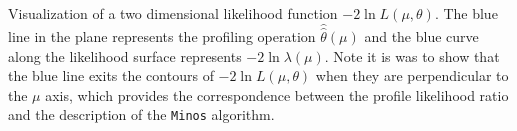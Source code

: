 Visualization of a two dimensional likelihood function $-2\ln L(\mu,\theta)$.  The blue line in the plane represents the profiling operation $\hat{\hat{\theta}}(\mu)$ and the blue curve along the likelihood surface represents $-2\ln \lambda(\mu)$.  Note it is was to show that the blue line exits the contours of $-2\ln L(\mu,\theta)$ when they are perpendicular to the $\mu$ axis, which provides the correspondence between the profile likelihood ratio and the description of the \texttt{Minos} algorithm.